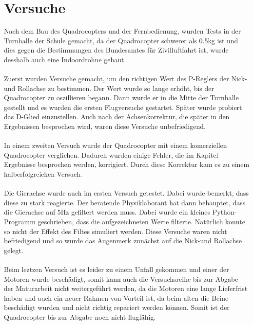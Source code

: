 \documentclass[12pt,a4paper, ngerman]{article}
\begin{document}
\section{Versuche}
Nach dem Bau des Quadrocopters und der Fernbedienung, wurden Tests in der Turnhalle der Schule gemacht, da der Quadrocopter schwerer als 0.5kg ist und dies gegen die Bestimmungen des Bundesamtes für Zivilluftfahrt ist, wurde desshalb auch eine Indoordrohne gebaut. \\ \\ Zuerst wurden Versuche gemacht, um den richtigen Wert des P-Reglers der Nick-und Rollachse zu bestimmen. Der Wert wurde so lange erhöht, bis der Quadrocopter zu oszillieren begann. Dann wurde er in die Mitte der Turnhalle gestellt und es wurden die ersten Flugversuche gestartet. Später wurde probiert das D-Glied einzustellen. Auch nach der Achsenkorrektur, die später in den Ergebnissen besprochen wird, waren diese Versuche unbefriedigend. \\ \\ In einem zweiten Versuch wurde der Quadrocopter mit einem komerziellen Quadrocopter verglichen. Dadurch wurden einige Fehler, die im Kapitel 
Ergebnisse besprochen werden, korrigiert. Durch diese Korrektur kam es zu einem halberfolgreichen Versuch. \\ \\ Die Gierachse wurde auch im ersten Versuch getestet. Dabei wurde bemerkt, dass diese zu stark reagierte. Der beratende Physiklaborant hat dann behauptet, dass die Gierachse auf 5Hz gefiltert werden muss. Dabei wurde ein kleines Python-Programm geschrieben, dass die aufgezeichneten Werte filterte. Natürlich konnte so nicht der Effekt des Filtes simuliert werden. Diese Versuche waren nicht befriedigend und so wurde das Augenmerk zunächst auf die Nick-und Rollachse gelegt. \\ \\ Beim leztzen Versuch ist es leider zu einem Unfall gekommen und einer der Motoren wurde beschädigt, somit kann auch die Versuchsreihe bis zur Abgabe der Maturarbeit nicht weitergeführt werden, da die Motoren eine lange Lieferfrist haben und auch ein neuer Rahmen von Vorteil ist, da beim alten die Beine beschädigt wurden und nicht richtig repariert werden können. Somit ist der Quadrocopter bis zur Abgabe noch nicht flugfähig. 
\newpage
\end{document}
